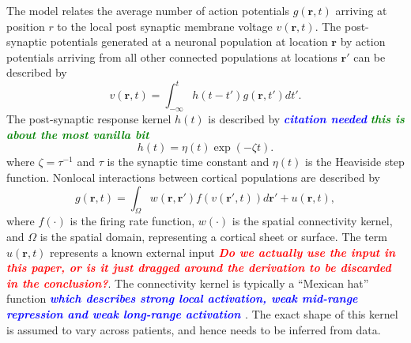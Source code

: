 \documentclass[12pt]{iopart}
\newcommand{\todo}[1]{\textsf{\emph{\textbf{\textcolor{blue}{#1}}}}}
\newcommand{\wtf}[1]{\textsf{\emph{\textbf{\textcolor{red}{#1}}}}}
\newcommand{\omg}[1]{\textsf{\emph{\textbf{\textcolor{green}{#1}}}}}
\begin{document}
The model relates the average number of action potentials $g(\mathbf{r},t)$ arriving at position $r$ to the local post synaptic membrane voltage $v(\mathbf{r},t)$. The post-synaptic potentials generated at a neuronal population at location $\mathbf{r}$ by action potentials arriving from all other connected populations at locations $\mathbf{r}'$ can be described by 
\begin{equation}
	\label{SpikesToPotential} v\left( {\mathbf{r},t} \right) = \int_{ - \infty }^t {h\left( {t - t'} \right)g\left( {\mathbf{r},t'} \right)dt'}. 
\end{equation}
The post-synaptic response kernel $h(t)$ is described by \todo{citation needed} \omg{this is about the most vanilla bit} 
\begin{equation}
	\label{SynapticRespKernel} h(t) = \eta(t)\exp{\left(-\zeta t\right)}. 
\end{equation}
where $\zeta=\tau^{-1}$ and $\tau$ is the synaptic time constant and $\eta(t)$ is the Heaviside step function. Nonlocal interactions between cortical populations are described by 
\begin{equation}
	\label{RateBasedInteractions} g\left( \mathbf{r},t \right) = \int_\Omega {w\left( \mathbf{r},\mathbf{r}' \right)f\left( v\left( \mathbf{r}',t \right) \right)d\mathbf{r}'} + u\left(\mathbf{r},t\right), 
\end{equation}
where $f(\cdot)$ is the firing rate function, $w(\cdot)$ is the spatial connectivity kernel, and $\Omega$ is the spatial domain, representing a cortical sheet or surface. The term $u\left(\mathbf{r},t\right)$ represents a known external input \wtf{Do we actually use the input in this paper, or is it just dragged around the derivation to be discarded in the conclusion?}. The connectivity kernel is typically a ``Mexican hat'' function \todo{which describes strong local activation, weak mid-range repression and weak long-range activation \cite{}}. The exact shape of this kernel is assumed to vary across patients, and hence needs to be inferred from data. 
\end{document}
